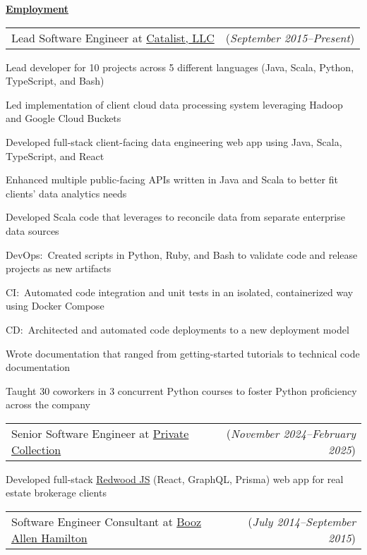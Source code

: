 \documentclass[11pt, letterpaper]{letter}
\makeatletter
\newlength{\indwidth}            \setlength{\indwidth}{\textwidth-.4in}
\newlength{\headerAntispace}     \setlength{\headerAntispace}{-6pt}
\newcommand{\dated}[2]{
    \begin{tabular*}{\indwidth}{l@{\extracolsep{\fill}}r}
        #1 & (\textit{#2})
    \end{tabular*}
}
\newcommand{\myul}[3]{
    \begingroup
        \renewcommand{\ULdepth}{#1}
        \renewcommand{\ULthickness}{#2}
        \uline{#3}
    \endgroup
}
\newcommand{\sectionheader}[1]{
    \myul{2.7pt}{0.5pt}{\large \textbf{#1}}
}
\newcommand{\CatalistLLC}{\href{https://catalist.us/}{Catalist, LLC}}
\newcommand{\BAH}{\href{https://www.boozallen.com/}{Booz Allen Hamilton}}
\makeatother
\begin{document}
\sectionheader{Employment}
\vspace{\headerAntispace}
\begin{compactitem}
    \item \dated{Lead Software Engineer at \CatalistLLC}{September 2015--Present}
        \begin{compactitem}
            \item Lead developer for 10 projects across 5 different languages (Java, Scala, Python, TypeScript, and
                Bash)
            \item Led implementation of client cloud data processing system leveraging Hadoop and Google Cloud Buckets
            \item Developed full-stack client-facing data engineering web app using Java, Scala, TypeScript, and React
            \item Enhanced multiple public-facing APIs written in Java and Scala to better fit clients' data analytics
                needs
            \item Developed Scala code that leverages \Elasticsearch{} to reconcile data from separate enterprise data
                sources
            \item DevOps:\ Created scripts in Python, Ruby, and Bash to validate code and release projects as new
                artifacts
            \item CI:\ Automated code integration and unit tests in an isolated, containerized way using Docker Compose
            \item CD:\ Architected and automated code deployments to a new \BlueGreen{} deployment model
            \item Wrote documentation that ranged from getting-started tutorials to technical code documentation
            \item Taught 30 coworkers in 3 concurrent Python courses to foster Python proficiency across the company
        \end{compactitem}
    \item \dated{Senior Software Engineer at \href{https://www.privatecollection.com/}{Private Collection}}{November 2024--February 2025}
        \begin{compactitem}
            \item Developed full-stack \href{https://redwoodjs.com/}{Redwood JS} (React, GraphQL, Prisma) web app for
                real estate brokerage clients
        \end{compactitem}
    \item \dated{Software Engineer Consultant at \BAH}{July 2014--September 2015}

\end{compactitem}
\end{document}
